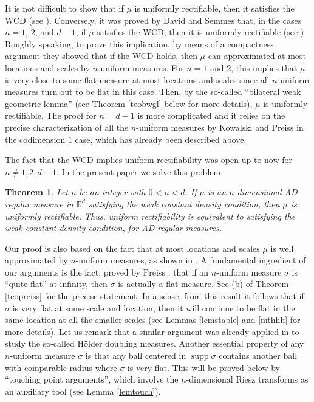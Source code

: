 \documentclass[11pt]{amsart}
\newcommand{\R}{{\mathbb R}}       %
\newcommand{\supp}{\operatorname{supp}}
\newtheorem{theorem}{Theorem}[section]
\theoremstyle{definition}
\theoremstyle{remark}
\numberwithin{equation}{section}
\begin{document}
It is not difficult to show that if $\mu$ is uniformly rectifiable, then 
it satisfies the WCD (see \cite[Chapter 6]{DS1}). Conversely, it was proved by David and Semmes that, in the cases $n=1$, $2$, and $d-1$, 
if $\mu$ satisfies the WCD, then it is uniformly rectifiable (see \cite[Chapter III.5]{DS}).
Roughly speaking, to prove this implication, by means of a compactness argument they showed that if 
the WCD holds, then $\mu$ can approximated at most locations and scales by $n$-uniform
measures. For $n=1$ and $2$, this implies that $\mu$ is very close to some flat measure
at most locations and scales
since all $n$-uniform measures turn out to be flat in this case. Then, by the so-called
``bilateral weak geometric lemma'' (see Theorem \ref{teobwgl} below for more details), $\mu$ is 
uniformly rectifiable. The proof for $n=d-1$ is more complicated and it relies on the
 precise
characterization of all the $n$-uniform measures by Kowalski and Preiss in the codimension $1$ case, 
which has already been described above. 

The fact that the WCD implies uniform rectifiability was open up to now for $n\neq1,2,d-1$.
In the present paper we solve this problem.



 \begin{theorem}\label{teowcd}
Let $n$ be an integer with $0<n<d$.
If $\mu$ is an $n$-dimensional AD-regular measure in $\R^d$ satisfying the weak constant density condition, then $\mu$ is uniformly rectifiable. Thus, uniform rectifiability is equivalent to satisfying the weak constant density condition, for AD-regular measures.
\end{theorem}


Our proof is also based on the fact that at most locations and scales $\mu$ is well approximated
by $n$-uniform measures, as shown in \cite{DS}. A fundamental ingredient of our arguments
is the fact, proved by Preiss \cite{Pr}, that if an $n$-uniform measure $\sigma$ is ``quite flat'' at infinity,
then $\sigma$ is actually a flat measure. See (b) of Theorem \ref{teopreiss} for the precise statement. 
In a sense, from this result it follows that if $\sigma$ is very flat at some scale and location, then it
will continue to be flat in the same location at all the smaller scales
(see Lemmas \ref{lemstable} and \ref{mthhh} for more details). Let us remark that a
similar argument was already applied in \cite{PTT} to study the so-called H\"older doubling 
measures. Another essential property of any $n$-uniform measure $\sigma$ is that any ball centered in $\supp\sigma$
contains another ball with comparable radius where $\sigma$ is very flat. This will be proved below by ``touching point arguments'', which involve the $n$-dimensional Riesz transforms as an auxiliary tool (see Lemma
\ref{lemtouch}).
\end{document}
